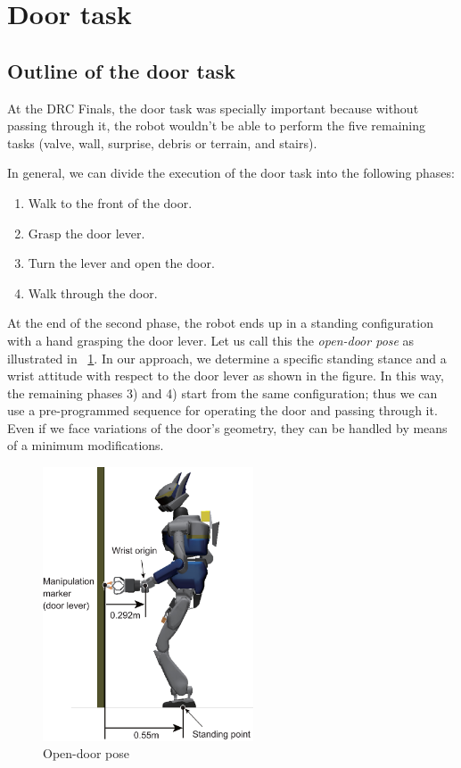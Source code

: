 \section{Door task}
	\label{sub:door}

\subsection{Outline of the door task}
%
At the DRC Finals, the door task was specially important because without passing through it,
the robot wouldn't be able to perform the five remaining tasks
(valve, wall, surprise, debris or terrain, and stairs).
   
In general, we can divide the execution of the door task into the following phases:
%
\begin{enumerate}
	\item Walk to the front of the door.
	\item Grasp the door lever.
	\item Turn the lever and open the door.
	\item Walk through the door.
\end{enumerate}
%

%

At the end of the second phase, the robot ends up in a standing configuration with a hand grasping
the door lever.
Let us call this the {\it open-door pose} as illustrated in \figurename~\ref{fig:door_approaching_config}.
In our approach, we determine a specific standing stance and a wrist attitude with respect to 
the door lever as shown in the figure.
In this way, the remaining phases 3) and 4) start from the same configuration;
thus we can use a pre-programmed sequence for operating the door and passing through it.
Even if we face variations of the door's geometry,
they can be handled by means of a minimum modifications.

\begin{figure}[t]
  \centering
  \includegraphics[width = 6.25cm]{img/door_approaching_config}
  \caption{Open-door pose}
  \label{fig:door_approaching_config}
\end{figure}

